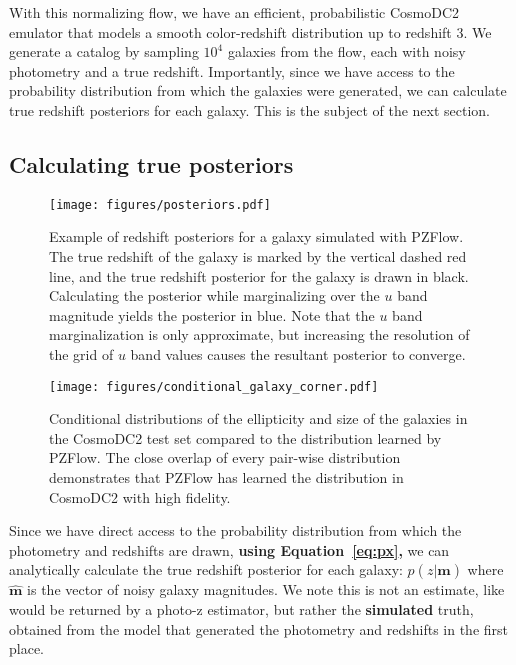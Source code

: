 \documentclass[twocolumn,twocolappendix]{aastex631}
\begin{document}
With this normalizing flow, we have an efficient, probabilistic CosmoDC2 emulator that models a smooth color-redshift distribution up to redshift 3.
We generate a catalog by sampling $10^4$ galaxies from the flow, each with noisy photometry and a true redshift.
Importantly, since we have access to the probability distribution from which the galaxies were generated, we can calculate true redshift posteriors for each galaxy.
This is the subject of the next section.

\subsection{Calculating true posteriors}
\label{sec:true-posteriors}

\begin{figure}[t]
    \begin{centering}
        \texttt{[image: figures/posteriors.pdf]}
        \caption{
            Example of redshift posteriors for a galaxy simulated with PZFlow.
            The true redshift of the galaxy is marked by the vertical dashed red line, and the true redshift posterior for the galaxy is drawn in black.
            Calculating the posterior while marginalizing over the $u$ band magnitude yields the posterior in blue.
            Note that the $u$ band marginalization is only approximate, but increasing the resolution of the grid of $u$ band values causes the resultant posterior to converge.
        }
        \label{fig:posteriors}
    \end{centering}
\end{figure}

\begin{figure*}[t]
    \begin{centering}
        \texttt{[image: figures/conditional\_galaxy\_corner.pdf]}
        \caption{
            Conditional distributions of the ellipticity and size of the galaxies in the CosmoDC2 test set compared to the distribution learned by PZFlow.
            The close overlap of every pair-wise distribution demonstrates that PZFlow has learned the distribution in CosmoDC2 with high fidelity.
        }
        \label{fig:conditional-corner}
    \end{centering}
\end{figure*}

Since we have direct access to the probability distribution from which the photometry and redshifts are drawn, \textbf{using Equation~\ref{eq:px},} we can analytically calculate the true redshift posterior for each galaxy: $p(z|\mathbf{\hat{m}})$ where $\mathbf{\hat{m}}$ is the vector of noisy galaxy magnitudes.
We note this is not an estimate, like would be returned by a photo-z estimator, but rather the \textbf{simulated} truth, obtained from the model that generated the photometry and redshifts in the first place.
\end{document}
